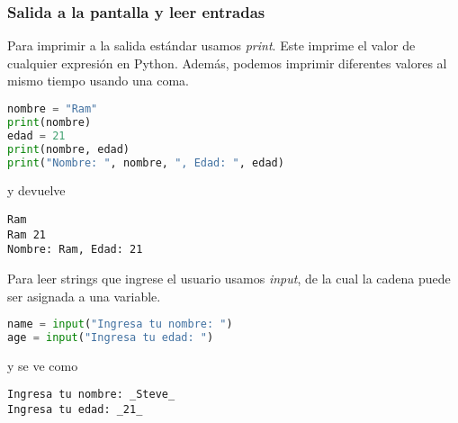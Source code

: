     \subsubsection{Salida a la pantalla y leer entradas}\label{subsubsec: salida_entrada}
    Para imprimir a la salida estándar usamos \emph{print}. Este imprime el valor de cualquier expresión en Python. Además, podemos imprimir diferentes valores al mismo tiempo usando una coma.
    \begin{lstlisting}[language={python}]
nombre = "Ram"
print(nombre)
edad = 21
print(nombre, edad)
print("Nombre: ", nombre, ", Edad: ", edad)
    \end{lstlisting}
    y devuelve
    \begin{lstlisting}[language={[latex]tex}]
Ram
Ram 21
Nombre: Ram, Edad: 21
    \end{lstlisting}
    Para leer strings que ingrese el usuario usamos \emph{input}, de la cual la cadena puede ser asignada a una variable.
    \begin{lstlisting}[language={python}]
name = input("Ingresa tu nombre: ")
age = input("Ingresa tu edad: ")
    \end{lstlisting}
    y se ve como
    \begin{lstlisting}[language={[latex]tex}]
Ingresa tu nombre: _Steve_
Ingresa tu edad: _21_
    \end{lstlisting}
